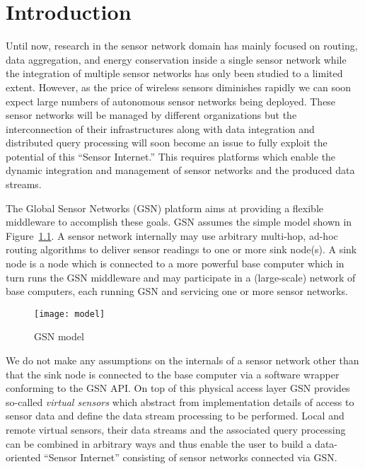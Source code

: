 \graphicspath{{chapters/ch-introduction/figures/}}
\chapter{Introduction}


\label{sec:introduction}

Until now, research in the sensor network domain has mainly focused on
routing, data aggregation, and energy conservation inside a single
sensor network while the integration of multiple sensor networks has
only been studied to a limited extent. However, as the price of
wireless sensors diminishes rapidly we can soon expect large numbers
of autonomous sensor networks being deployed. These sensor networks
will be managed by different organizations but the interconnection of
their infrastructures along with data integration and distributed
query processing will soon become an issue to fully exploit the
potential of this ``Sensor Internet.'' This requires platforms which
enable the dynamic integration and management of sensor networks and
the produced data streams.

The Global Sensor Networks (GSN) platform aims at providing a flexible
middleware to accomplish these goals.  GSN assumes the simple model
shown in Figure~\ref{fig:setup}. A sensor network internally may use
arbitrary multi-hop, ad-hoc routing algorithms to deliver sensor
readings to one or more sink node(s). A sink node is a node which is
connected to a more powerful base computer which in turn runs the GSN
middleware and may participate in a (large-scale) network of base
computers, each running GSN and servicing one or more sensor networks.

\begin{figure}
  \centering
  \texttt{[image: model]}
  \caption{GSN model}
  \label{fig:setup}
\end{figure}

We do not make any assumptions on the internals of a sensor network
other than that the sink node is connected to the base computer via a
software wrapper conforming to the GSN API. On top of this physical
access layer GSN provides so-called \textit{virtual sensors} which
abstract from implementation details of access to sensor data and
define the data stream processing to be performed. Local and remote
virtual sensors, their data streams and the associated query
processing can be combined in arbitrary ways and thus enable the user
to build a data-oriented ``Sensor Internet'' consisting of sensor
networks connected via GSN.

